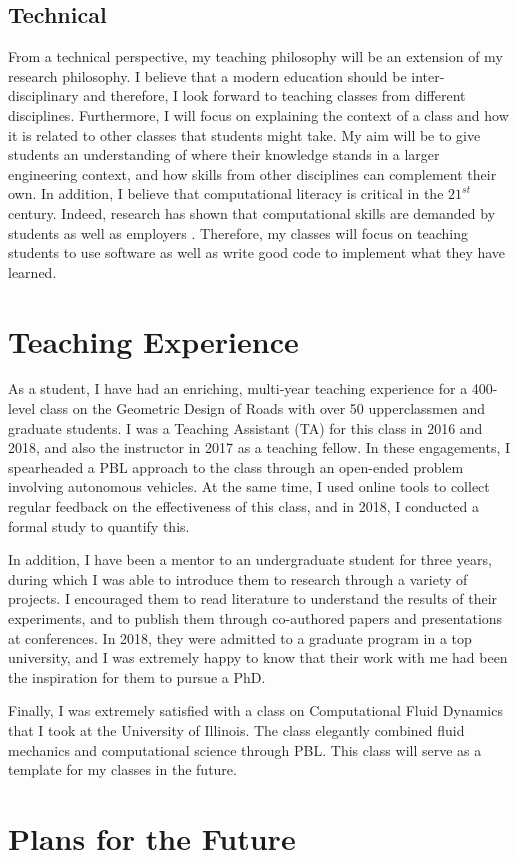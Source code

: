 \documentclass[12pt]{article}
\begin{document}
\subsection*{Technical}  
From a technical perspective, my teaching philosophy will be an extension of my research philosophy. I believe that a modern education should be inter-disciplinary and therefore, I look forward to teaching classes from different disciplines. Furthermore, I will focus on explaining the context of a class and how it is related to other classes that students might take. My aim will be to give students an understanding of where their knowledge stands in a larger engineering context, and how skills from other disciplines can complement their own. In addition, I believe that computational literacy is critical in the $21^{st}$ century. Indeed, research has shown that computational skills are demanded by students as well as employers \cite{magana2012motivation}. Therefore, my classes will focus on teaching students to use software as well as write good code to implement what they have learned.

\section*{Teaching Experience}
As a student, I have had an enriching, multi-year teaching experience for a 400-level class on the Geometric Design of Roads with over 50 upperclassmen and graduate students. I was a Teaching Assistant (TA) for this class in 2016 and 2018, and also the instructor in 2017 as a teaching fellow. In these engagements, I spearheaded a PBL approach to the class through an open-ended problem involving autonomous vehicles. At the same time, I used online tools to collect regular feedback on the effectiveness of this class, and in 2018, I conducted a formal study to quantify this.

In addition, I have been a mentor to an undergraduate student for three years, during which I was able to introduce them to research through a variety of projects. I encouraged them to read literature to understand the results of their experiments, and to publish them through co-authored papers and presentations at conferences. In 2018, they were admitted to a graduate program in a top university, and I was extremely happy to know that their work with me had been the inspiration for them to pursue a PhD.

Finally, I was extremely satisfied with a class on Computational Fluid Dynamics that I took at the University of Illinois. The class elegantly combined fluid mechanics and computational science through PBL. This class will serve as a template for my classes in the future.

\section*{Plans for the Future}


 

\end{document}
